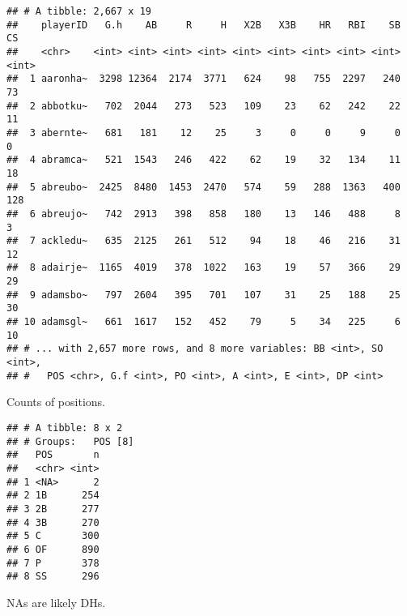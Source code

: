 \documentclass[]{book}
\newenvironment{Shaded}{\begin{snugshade}}{\end{snugshade}}
\newcommand{\KeywordTok}[1]{\textcolor[rgb]{0.13,0.29,0.53}{\textbf{#1}}}
\newcommand{\DataTypeTok}[1]{\textcolor[rgb]{0.13,0.29,0.53}{#1}}
\newcommand{\StringTok}[1]{\textcolor[rgb]{0.31,0.60,0.02}{#1}}
\newcommand{\OperatorTok}[1]{\textcolor[rgb]{0.81,0.36,0.00}{\textbf{#1}}}
\newcommand{\NormalTok}[1]{#1}
\begin{document}
\begin{verbatim}
## # A tibble: 2,667 x 19
##    playerID   G.h    AB     R     H   X2B   X3B    HR   RBI    SB    CS
##    <chr>    <int> <int> <int> <int> <int> <int> <int> <int> <int> <int>
##  1 aaronha~  3298 12364  2174  3771   624    98   755  2297   240    73
##  2 abbotku~   702  2044   273   523   109    23    62   242    22    11
##  3 abernte~   681   181    12    25     3     0     0     9     0     0
##  4 abramca~   521  1543   246   422    62    19    32   134    11    18
##  5 abreubo~  2425  8480  1453  2470   574    59   288  1363   400   128
##  6 abreujo~   742  2913   398   858   180    13   146   488     8     3
##  7 ackledu~   635  2125   261   512    94    18    46   216    31    12
##  8 adairje~  1165  4019   378  1022   163    19    57   366    29    29
##  9 adamsbo~   797  2604   395   701   107    31    25   188    25    30
## 10 adamsgl~   661  1617   152   452    79     5    34   225     6    10
## # ... with 2,657 more rows, and 8 more variables: BB <int>, SO <int>,
## #   POS <chr>, G.f <int>, PO <int>, A <int>, E <int>, DP <int>
\end{verbatim}

Counts of positions.

\begin{Shaded}
\end{Shaded}

\begin{verbatim}
## # A tibble: 8 x 2
## # Groups:   POS [8]
##   POS       n
##   <chr> <int>
## 1 <NA>      2
## 2 1B      254
## 3 2B      277
## 4 3B      270
## 5 C       300
## 6 OF      890
## 7 P       378
## 8 SS      296
\end{verbatim}

NAs are likely DHs.

\begin{Shaded}
\end{Shaded}
\end{document}
